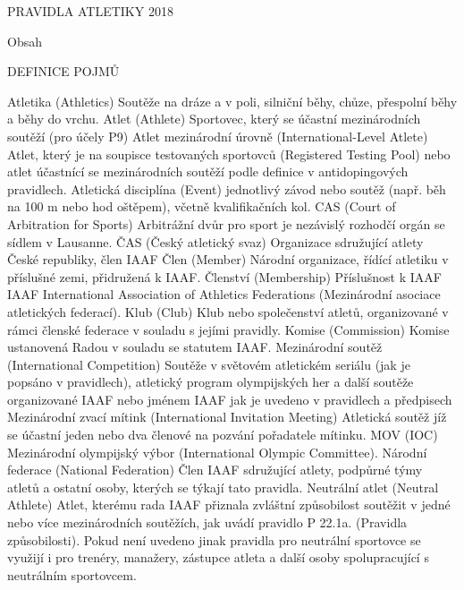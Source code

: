 

\tit PRAVIDLA ATLETIKY 2018
\vfill
\break

\nonum\notoc\chap Obsah
\maketoc
\vfill
\break

\nonum\chap DEFINICE POJMŮ

\dt Atletika (Athletics)
\dd Soutěže na dráze a v poli, silniční běhy, chůze, přespolní běhy a běhy do vrchu.
\dend
\dt Atlet (Athlete)
\dd Sportovec, který se účastní mezinárodních soutěží (pro účely P9)
\dend
\dt Atlet mezinárodní úrovně (International-Level Atlete)
\dd Atlet, který je na soupisce testovaných sportovců (Registered Testing Pool) nebo atlet účastnící se mezinárodních soutěží podle definice v antidopingových pravidlech.
\dend
\dt Atletická disciplína (Event)
\dd jednotlivý závod nebo soutěž (např. běh na 100 m nebo hod oštěpem), včetně kvalifikačních kol.
\dend
\dt CAS (Court of Arbitration for Sports)
\dd Arbitrážní dvůr pro sport je nezávislý rozhodčí orgán se sídlem v Lausanne.
\dend
\dt ČAS (Český atletický svaz)
\dd Organizace sdružující atlety České republiky, člen IAAF
\dend
\dt Člen (Member)
\dd Národní organizace, řídící atletiku v příslušné zemi, přidružená k IAAF.
\dend
\dt Členství (Membership)
\dd Příslušnost k IAAF
\dend
\dt IAAF
\dd International Association of Athletics Federations (Mezinárodní asociace atletických federací).
\dend
\dt Klub (Club)
\dd Klub nebo společenství atletů, organizované v rámci členské federace v souladu s jejími pravidly.
\dend
\dt Komise (Commission)
\dd Komise ustanovená Radou v souladu se statutem IAAF.
\dend
\dt Mezinárodní soutěž (International Competition)
\dd Soutěže v světovém atletickém seriálu (jak je popsáno v pravidlech), atletický program olympijských her a další soutěže organizované IAAF nebo jménem IAAF jak je uvedeno v pravidlech a předpisech
\dend
\dt Mezinárodní zvací mítink (International Invitation Meeting)
\dd Atletická soutěž jíž se účastní jeden nebo dva členové na pozvání pořadatele mítinku.
\dend
\dt MOV (IOC)
\dd Mezinárodní olympijský výbor (International Olympic Committee).
\dend
\dt Národní federace (National Federation)
\dd Člen IAAF sdružující atlety, podpůrné týmy atletů a ostatní osoby, kterých se týkají tato pravidla.
\dend
\dt Neutrální atlet (Neutral Athlete)
\dd Atlet, kterému rada IAAF přiznala zvláštní způsobilost soutěžit v jedné nebo více mezinárodních soutěžích, jak uvádí pravidlo P 22.1a. (Pravidla způsobilosti). Pokud není uvedeno jinak pravidla pro neutrální sportovce se využijí i pro trenéry, manažery, zástupce atleta a další osoby spolupracující s neutrálním sportovcem.
